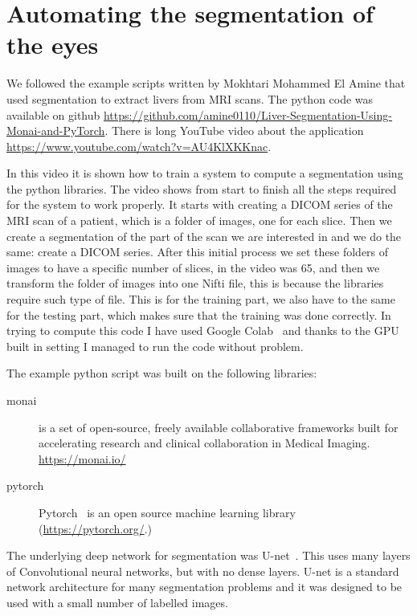 \documentclass[12pt]{article}
\begin{document}
\section{Automating the segmentation of the eyes}

We followed the example scripts written by
Mokhtari Mohammed El Amine that used segmentation to extract
livers from MRI scans. The python code was available
on github
\url{https://github.com/amine0110/Liver-Segmentation-Using-Monai-and-PyTorch}. There
is long YouTube video about the application
\url{https://www.youtube.com/watch?v=AU4KlXKKnac}.


In this video it is shown how to train a system to compute a
segmentation using the python libraries. The video shows
from start to finish all the steps required for the system to work
properly. It starts with creating a DICOM series of the MRI scan of a
patient, which is a folder of images, one for each slice. Then we
create a segmentation of the part of the scan we are interested in and
we do the same: create a DICOM series. After this initial process we
set these folders of images to have a specific number of slices, in
the video was 65, and then we transform the folder of images into one
Nifti file, this is because the libraries require such type of
file. This is for the training part, we also have to the same for the
testing part, which makes sure that the training was done correctly.
In trying to compute this code I have used Google Colab~\cite{bisong2019google}
and thanks to
the GPU built in setting I managed to run the code without problem.


The example python script was built on the following libraries:

\begin{description}

  \item[monai] is a set of open-source, freely available collaborative frameworks built for accelerating research and clinical collaboration in Medical Imaging.  \url{https://monai.io/}

\item[pytorch] Pytorch~\cite{paszke2019pytorch}
  is an open source machine learning library  (\url{https://pytorch.org/}.)
    
\end{description}

The underlying deep network for segmentation was
U-net~\cite{ronneberger2015u}.  This uses many layers of Convolutional
neural networks, but with no dense layers.  U-net is a standard
network architecture for many segmentation problems and it was
designed to be used with a small number of labelled images.
\end{document}
